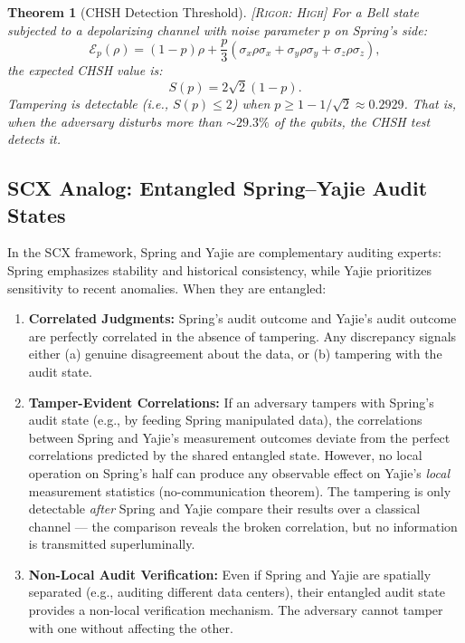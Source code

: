 \documentclass[11pt,a4paper]{article}
\theoremstyle{plain}
\newtheorem{theorem}{Theorem}[section]
\theoremstyle{definition}
\theoremstyle{remark}
\newcommand{\cE}{\mathcal{E}}
\newcommand{\pauliX}{\sigma_x}
\newcommand{\pauliY}{\sigma_y}
\newcommand{\pauliZ}{\sigma_z}
\newcommand{\rigorHigh}{\textsc{[Rigor: High]}}
\begin{document}
\begin{theorem}[CHSH Detection Threshold]
\label{thm:chsh_threshold}
\rigorHigh
For a Bell state subjected to a depolarizing channel with noise parameter
$p$ on Spring's side:
\[
\cE_p(\rho) = (1-p)\rho + \frac{p}{3}(\pauliX\rho\pauliX +
\pauliY\rho\pauliY + \pauliZ\rho\pauliZ),
\]
the expected CHSH value is:
\[
S(p) = 2\sqrt{2}(1-p).
\]
Tampering is detectable (i.e., $S(p) \leq 2$) when $p \geq 1 - 1/\sqrt{2}
\approx 0.2929$. That is, when the adversary disturbs more than
$\sim 29.3\%$ of the qubits, the CHSH test detects it.
\end{theorem}

\subsection{SCX Analog: Entangled Spring--Yajie Audit States}
\label{sec:ent_scx}

In the SCX framework, Spring and Yajie are complementary auditing experts:
Spring emphasizes stability and historical consistency, while Yajie prioritizes
sensitivity to recent anomalies. When they are entangled:

\begin{enumerate}[label=(\arabic*)]
  \item \textbf{Correlated Judgments:} Spring's audit outcome and Yajie's
        audit outcome are perfectly correlated in the absence of tampering.
        Any discrepancy signals either (a) genuine disagreement about the
        data, or (b) tampering with the audit state.
  
  \item \textbf{Tamper-Evident Correlations:} If an adversary tampers with
        Spring's audit state (e.g., by feeding Spring manipulated data),
        the correlations between Spring and Yajie's measurement outcomes
        deviate from the perfect correlations predicted by the shared
        entangled state. However, no local operation on Spring's half
        can produce any observable effect on Yajie's \emph{local}
        measurement statistics (no-communication theorem). The tampering
        is only detectable \emph{after} Spring and Yajie compare their
        results over a classical channel — the comparison reveals the
        broken correlation, but no information is transmitted superluminally.
  
  \item \textbf{Non-Local Audit Verification:} Even if Spring and Yajie
        are spatially separated (e.g., auditing different data centers),
        their entangled audit state provides a non-local verification
        mechanism. The adversary cannot tamper with one without affecting
        the other.
\end{enumerate}
\end{document}
